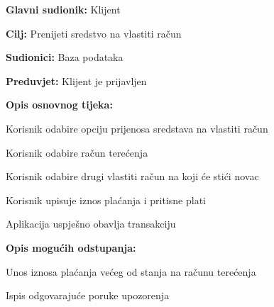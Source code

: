     			
    			\noindent {}
    			\begin{packed_item}
    				
    				\item \textbf{Glavni sudionik: }Klijent
    				\item  \textbf{Cilj:} Prenijeti sredstvo na vlastiti račun
    				\item  \textbf{Sudionici:} Baza podataka
    				\item  \textbf{Preduvjet:} Klijent je prijavljen
    				\item  \textbf{Opis osnovnog tijeka:}
    				
    				\item[] \begin{packed_enum}
    					
    					\item Korisnik odabire opciju prijenosa sredstava na vlastiti račun
    					\item Korisnik odabire račun terećenja 
    					\item Korisnik odabire drugi vlastiti račun na koji će stići novac
    					\item Korisnik upisuje iznos plaćanja i pritisne plati
    					\item Aplikacija uspješno obavlja transakciju 
    					
    				\end{packed_enum}
    					
    				
    						\item  \textbf{Opis mogućih odstupanja:}
    					
    					\item[] \begin{packed_item}
    						
    						\item[4.a] Unos iznosa plaćanja većeg od stanja na računu terećenja
    						\item[] \begin{packed_enum}
    							
    							\item Ispis odgovarajuće poruke upozorenja
    							
    							
    						\end{packed_enum}
    						
    						
    					\end{packed_item}
    					
    			
    				
    			\end{packed_item}
    		
